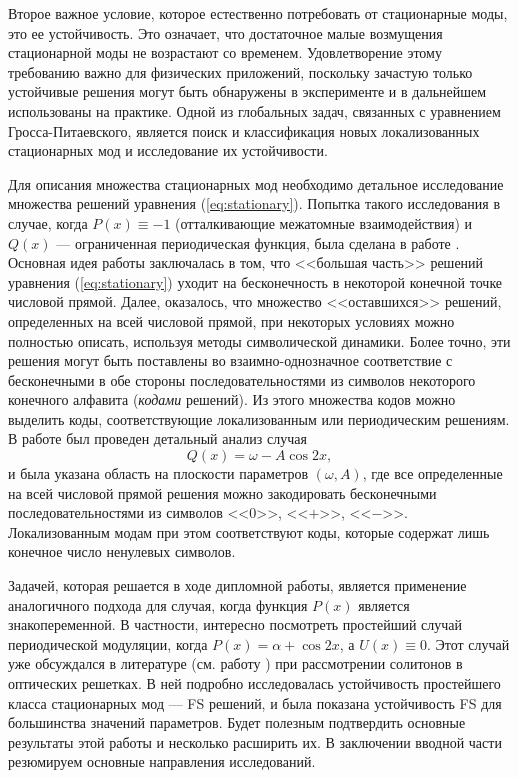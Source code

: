 Второе важное условие, которое естественно потребовать от стационарные моды, это ее устойчивость.
Это означает, что достаточное малые возмущения стационарной моды не возрастают со временем.
Удовлетворение этому требованию важно для физических приложений, поскольку зачастую только устойчивые решения могут быть обнаружены в эксперименте и в дальнейшем использованы на практике.
Одной из глобальных задач, связанных с уравнением Гросса-Питаевского, является поиск и классификация новых локализованных стационарных мод и исследование их устойчивости.

Для описания множества стационарных мод необходимо детальное исследование множества решений уравнения (\ref{eq:stationary}).
Попытка такого исследования в случае, когда $P(x) \equiv -1$ (отталкивающие межатомные взаимодействия) и $Q(x)$ --- ограниченная периодическая функция, была сделана в работе \cite{AlfAvr}.
Основная идея работы \cite{AlfAvr} заключалась в том, что <<большая часть>> решений уравнения (\ref{eq:stationary}) уходит на бесконечность в некоторой конечной точке числовой прямой.
Далее, оказалось, что множество <<оставшихся>> решений, определенных на всей числовой прямой, при некоторых условиях можно полностью описать, используя методы символической динамики.
Более точно, эти решения могут быть поставлены во взаимно-однозначное соответствие с бесконечными в обе стороны последовательностями из символов некоторого конечного алфавита ({\it кодами} решений).
Из этого множества кодов можно выделить коды, соответствующие локализованным или периодическим решениям.
В работе \cite{AlfAvr} был проведен детальный анализ случая
$$Q(x) = \omega - A \cos 2x,$$
и была указана область на плоскости параметров $(\omega, A)$, где все определенные на всей числовой прямой решения можно закодировать бесконечными последовательностями из символов <<$0$>>,  <<$+$>>, <<$-$>>.
Локализованным модам при этом соответствуют коды, которые содержат лишь конечное число ненулевых символов.

Задачей, которая решается в ходе дипломной работы, является применение аналогичного подхода для случая, когда функция $P(x)$ является знакопеременной.
В частности, интересно посмотреть простейший случай периодической модуляции, когда $P(x) = \alpha + \cos 2x$, а $U(x) \equiv 0$.
Этот случай уже обсуждался в литературе (см. работу \cite{Malomed}) при рассмотрении солитонов в оптических решетках.
В ней подробно исследовалась устойчивость простейшего класса стационарных мод --- FS решений, и была показана устойчивость FS для большинства значений параметров.
Будет полезным подтвердить основные результаты этой работы и несколько расширить их.
В заключении вводной части резюмируем основные направления исследований.

